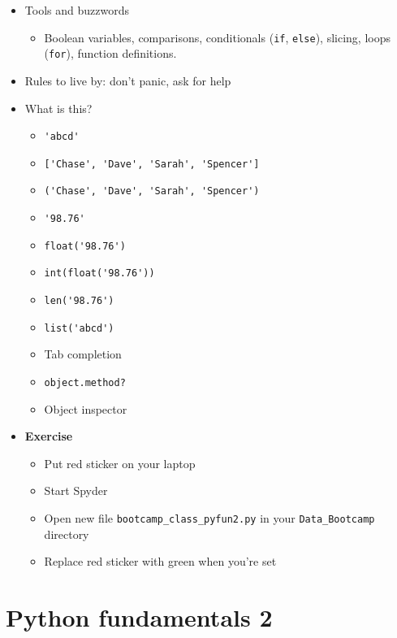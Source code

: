 \begin{itemize}

\item Tools and buzzwords
\begin{itemize}
\item Boolean variables, comparisons, conditionals ({\tt if}, {\tt else}), slicing,
loops ({\tt for}), function definitions.
\end{itemize}

\item Rules to live by:  don't panic, ask for help

\item What is this?
\begin{itemize}
\item \verb|'abcd' |
\item \verb|['Chase', 'Dave', 'Sarah', 'Spencer'] |
\item \verb|('Chase', 'Dave', 'Sarah', 'Spencer') |
\item \verb|'98.76'|
\item \verb|float('98.76')|
\item \verb|int(float('98.76'))|
\item \verb|len('98.76')|
\item \verb|list('abcd')|
\item Tab completion
\item {\tt object.method?}
\item Object inspector
\end{itemize}

\item {\bf Exercise}
\begin{itemize}
\item Put red sticker on your laptop
\item Start Spyder
\item Open new file  \verb|bootcamp_class_pyfun2.py|
in your \verb|Data_Bootcamp| directory
\item Replace red sticker with green when you're set
\end{itemize}

\end{itemize}


\section*{Python fundamentals 2}

